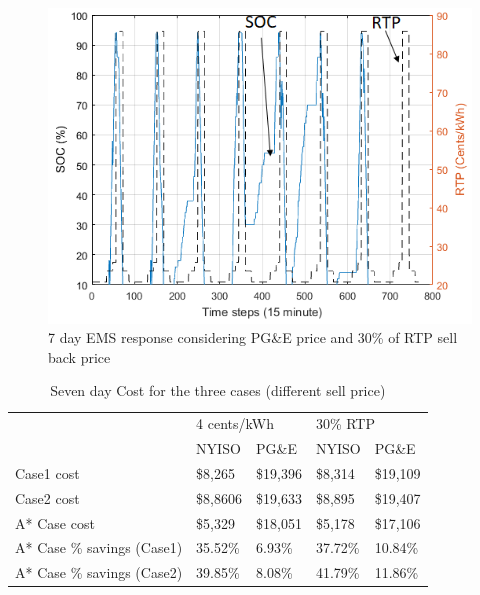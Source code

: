  \begin{figure}[!ht]
    \centering
    \includegraphics[width = \linewidth]{figs/PG_VAR_10_12_30rtp.png}
    \caption{7 day EMS response considering PG\&E price and 30\% of RTP sell back price}
    \label{fig:PG_VAR_10_12_30rtp}
\end{figure}


\begin{table}[htb]
\caption{Seven day Cost for the three cases (different sell price)}
\label{tab:Cost}
\centering

\begin{tabular}{l|l|l|l|l|}
\cline{2-5}
                            & \multicolumn{2}{l|}{4 cents/kWh} & \multicolumn{2}{l|}{30\% RTP}   \\ \cline{2-5} 
                            & NYISO           & PG\&E          & NYISO          & PG\&E          \\ \hline
\multicolumn{1}{|l|}{Case1 cost} & \$8,265  & \$19,396 & \$8,314 & \$19,109 \\ \hline
\multicolumn{1}{|l|}{Case2 cost} & \$8,8606  & \$19,633 & \$8,895 & \$19,407 \\ \hline
\multicolumn{1}{|l|}{A* Case cost} & \$5,329  & \$18,051 & \$5,178 & \$17,106 \\ \hline
\multicolumn{1}{|l|}{A* Case \% savings (Case1)} & 35.52\%         & 6.93\%         & 37.72\%        & 10.84\%        \\ \hline
\multicolumn{1}{|l|}{A* Case \% savings (Case2)} & 39.85\%         & 8.08\%         & 41.79\%        & 11.86\%        \\ \hline
\end{tabular}

\end{table}




